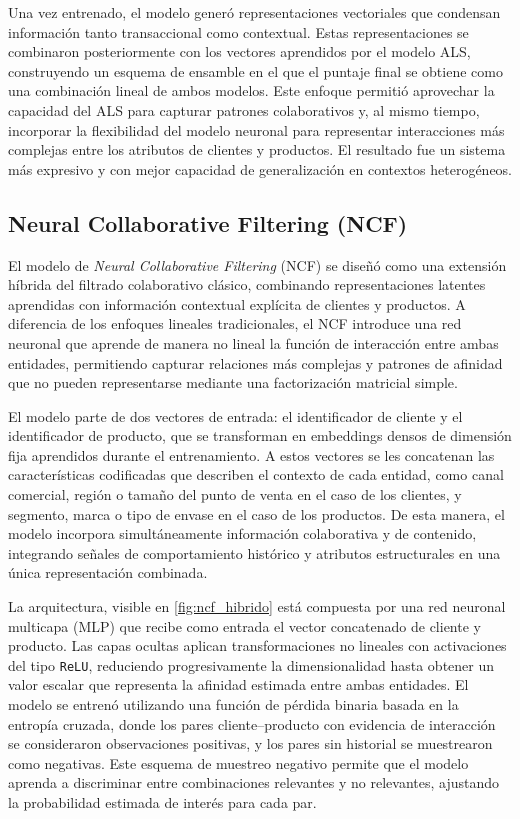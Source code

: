 Una vez entrenado, el modelo generó representaciones vectoriales que condensan información tanto transaccional como contextual. Estas representaciones se combinaron posteriormente con los vectores aprendidos por el modelo ALS, construyendo un esquema de ensamble en el que el puntaje final se obtiene como una combinación lineal de ambos modelos. Este enfoque permitió aprovechar la capacidad del ALS para capturar patrones colaborativos y, al mismo tiempo, incorporar la flexibilidad del modelo neuronal para representar interacciones más complejas entre los atributos de clientes y productos. El resultado fue un sistema más expresivo y con mejor capacidad de generalización en contextos heterogéneos.

\subsection{Neural Collaborative Filtering (NCF)}

El modelo de \textit{Neural Collaborative Filtering} (NCF) \cite{ARTICLE:He2017} se diseñó como una extensión híbrida del filtrado colaborativo clásico, combinando representaciones latentes aprendidas con información contextual explícita de clientes y productos. A diferencia de los enfoques lineales tradicionales, el NCF introduce una red neuronal que aprende de manera no lineal la función de interacción entre ambas entidades, permitiendo capturar relaciones más complejas y patrones de afinidad que no pueden representarse mediante una factorización matricial simple.

El modelo parte de dos vectores de entrada: el identificador de cliente y el identificador de producto, que se transforman en embeddings densos de dimensión fija aprendidos durante el entrenamiento. A estos vectores se les concatenan las características codificadas que describen el contexto de cada entidad, como canal comercial, región o tamaño del punto de venta en el caso de los clientes, y segmento, marca o tipo de envase en el caso de los productos. De esta manera, el modelo incorpora simultáneamente información colaborativa y de contenido, integrando señales de comportamiento histórico y atributos estructurales en una única representación combinada.

La arquitectura, visible en \ref{fig:ncf_hibrido} está compuesta por una red neuronal multicapa (MLP) que recibe como entrada el vector concatenado de cliente y producto. Las capas ocultas aplican transformaciones no lineales con activaciones del tipo \texttt{ReLU}, reduciendo progresivamente la dimensionalidad hasta obtener un valor escalar que representa la afinidad estimada entre ambas entidades. El modelo se entrenó utilizando una función de pérdida binaria basada en la entropía cruzada, donde los pares cliente–producto con evidencia de interacción se consideraron observaciones positivas, y los pares sin historial se muestrearon como negativas. Este esquema de muestreo negativo permite que el modelo aprenda a discriminar entre combinaciones relevantes y no relevantes, ajustando la probabilidad estimada de interés para cada par.

